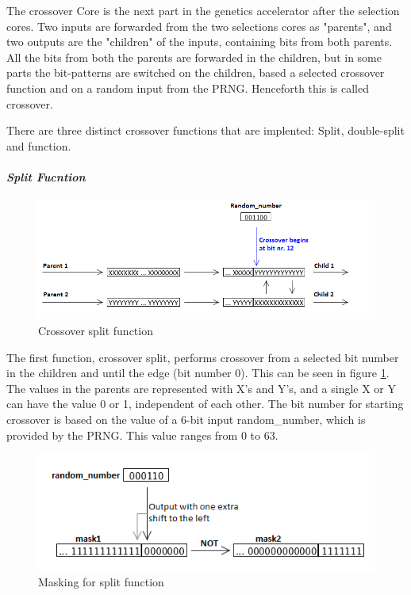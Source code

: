 The crossover Core is the next part in the genetics accelerator after the selection cores.
Two inputs are forwarded from the two selections cores as "parents", and two outputs are the "children" of the inputs, containing bits from both parents.
All the bits from both the parents are forwarded in the children, but in some parts the bit-patterns are switched on the children, based a selected crossover function and on a random input from the PRNG.
Henceforth this is called crossover.

There are three distinct crossover functions that are implented: Split, double-split and function.


\paragraph{\textit{Split Fucntion}}
\begin{figure}[H]
\includegraphics[width=\textwidth]{fpga/fig/crossover_split.png}
\caption{Crossover split function}
\label{fig_crossover_split}
\end{figure}

The first function, crossover split, performs crossover from a selected bit number in the children and until the edge (bit number 0).
This can be seen in figure \ref{fig_crossover_split}.
The values in the parents are represented with X's and Y's, and a single X or Y can have the value 0 or 1, independent of each other.
The bit number for starting crossover is based on the value of a 6-bit input random\_number, which is provided by the PRNG.
This value ranges from 0 to 63.

\begin{figure}[H]
\includegraphics[width=\textwidth]{fpga/fig/crossover_split_mask.png}
\caption{Masking for split function}
\label{fig_crossover_split_mask}
\end{figure}


